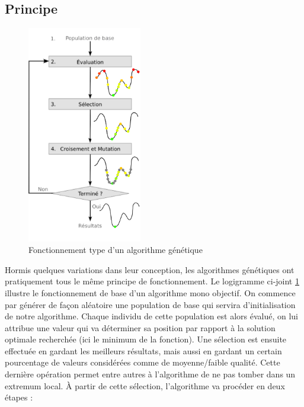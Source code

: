 \documentclass[12pt]{report}
\begin{document}
      \subsection{Principe}
        \begin{figure}
        \centering
        \includegraphics[width=5cm]{img/schema_algo_single.png}
        \caption{Fonctionnement type d'un algorithme génétique}
        \label{logi}
        \end{figure}
        Hormis quelques variations dans leur conception, les algorithmes génétiques ont pratiquement tous le même principe de fonctionnement.
        Le logigramme ci-joint \ref{logi} illustre le fonctionnement de base d'un algorithme mono objectif.
        On commence par générer de façon aléatoire une population de base qui servira d'initialisation de notre algorithme.
        Chaque individu de cette population est alors évalué, on lui attribue une valeur qui va déterminer sa position par rapport à la solution optimale recherchée (ici le minimum de la fonction).
        Une sélection est ensuite effectuée en gardant les meilleurs résultats, mais aussi en gardant un certain pourcentage de valeurs considérées comme de moyenne/faible qualité. Cette dernière opération permet entre autres à l'algorithme de ne pas tomber dans un extremum local.
        À partir de cette sélection, l'algorithme va procéder en deux étapes :
\end{document}
